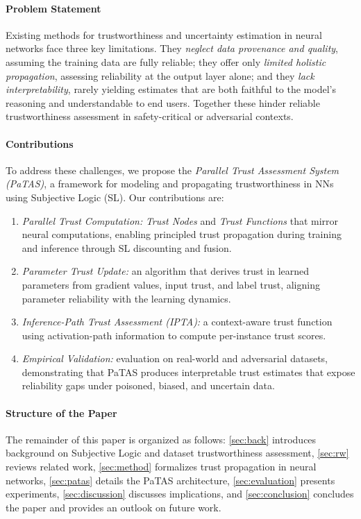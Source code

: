 \paragraph*{Problem Statement}
Existing methods for trustworthiness and uncertainty estimation in neural networks face three key limitations. They \emph{neglect data provenance and quality}, assuming the training data are fully reliable; they offer only \emph{limited holistic propagation}, assessing reliability at the output layer alone; and they \emph{lack interpretability}, rarely yielding estimates that are both faithful to the model's reasoning and understandable to end users. Together these hinder reliable trustworthiness assessment in safety-critical or adversarial contexts.

\paragraph*{Contributions}
To address these challenges, we propose the \emph{Parallel Trust Assessment System (PaTAS)}, a framework for modeling and propagating trustworthiness in NNs using Subjective Logic (SL). Our contributions are:
\begin{enumerate}
    \item \emph{Parallel Trust Computation:} \textit{Trust Nodes} and \textit{Trust Functions} that mirror neural computations, enabling principled trust propagation during training and inference through SL discounting and fusion.
    \item \emph{Parameter Trust Update:} an algorithm that derives trust in learned parameters from gradient values, input trust, and label trust, aligning parameter reliability with the learning dynamics.
    \item \emph{Inference-Path Trust Assessment (IPTA):} a context-aware trust function using activation-path information to compute per-instance trust scores.
    \item \emph{Empirical Validation:} evaluation on real-world and adversarial datasets, demonstrating that PaTAS produces interpretable trust estimates that expose reliability gaps under poisoned, biased, and uncertain data.
\end{enumerate}

\paragraph*{Structure of the Paper}
The remainder of this paper is organized as follows: \cref{sec:back} introduces background on Subjective Logic and dataset trustworthiness assessment, \cref{sec:rw} reviews related work, \cref{sec:method} formalizes trust propagation in neural networks, \cref{sec:patas} details the PaTAS architecture, \cref{sec:evaluation} presents experiments, \cref{sec:discussion} discusses implications, and \cref{sec:conclusion} concludes the paper and provides an outlook on future work.
